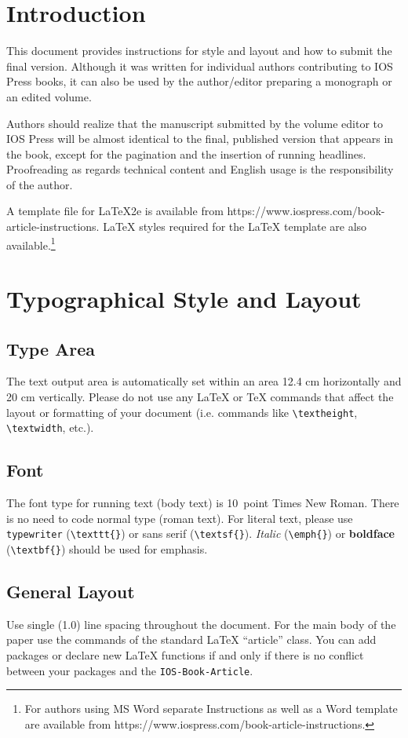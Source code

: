 \documentclass{IOS-Book-Article}
\begin{document}
\section{Introduction}
This document provides instructions for style and layout and how to submit the final
version. Although it was written for individual authors contributing to IOS Press books,
it can also be used by the author/editor preparing a monograph or an edited volume.

Authors should realize that the manuscript submitted by the volume editor to IOS
Press will be almost identical to the final, published version that appears in the book,
except for the pagination and the insertion of running headlines. Proofreading as
regards technical content and English usage is the responsibility of the author.

A template file for \LaTeX2e is available from
https://www.iospress.com/book-article-instructions. \LaTeX{} styles required for the \LaTeX{} template are also
available.\footnote{For authors using MS Word separate Instructions as well
as a Word template are available from https://www.iospress.com/book-article-instructions.}

\section{Typographical Style and Layout}

\subsection{Type Area}
The text output area is automatically set within an area 12.4 cm
horizontally and 20 cm vertically. Please do not use any
\LaTeX{} or \TeX{} commands that affect the layout or formatting of
your document (i.e. commands like \verb|\textheight|,
\verb|\textwidth|, etc.).



\subsection{Font}

The font type for running text (body text) is 10~point Times New Roman.
There is no need to code normal type (roman text). For literal text, please use
\texttt{type\-writer} (\verb|\texttt{}|)
or \textsf{sans serif} (\verb|\textsf{}|). \emph{Italic} (\verb|\emph{}|)
or \textbf{boldface} (\verb|\textbf{}|) should be used for emphasis.

\subsection{General Layout}
Use single (1.0) line spacing throughout the document. For the main
body of the paper use the commands of the standard \LaTeX{}
``article'' class. You can add packages or declare new \LaTeX{}
functions if and only if there is no conflict between your packages
and the \texttt{IOS-Book-Article}.
\end{document}
